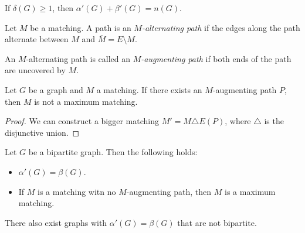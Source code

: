 
\begin{theorem}[Gallai]
    If $\delta(G) \ge 1$, then $\alpha'(G) + \beta'(G) = n(G)$.
\end{theorem}


\begin{definition}
    Let $M$ be a matching. A path is an \emph{$M$-alternating path}
    if the edges along the path alternate between $M$ and $\overline{M} = E \setminus M$.
\end{definition}

\begin{definition}
    An $M$-alternating path is called an \emph{$M$-augmenting path}
    if both ends of the path are uncovered by $M$.
\end{definition}


\begin{proposition}
    Let $G$ be a graph and $M$ a matching. If there exists an $M$-augmenting path 
    $P$, then $M$ is not a maximum matching.
\end{proposition}

\begin{proof}
    We can construct a bigger matching $M' = M \triangle E(P)$, where 
    $\triangle$ is the disjunctive union.
\end{proof}

\begin{theorem}[König]
    Let $G$ be a bipartite graph. Then the following holds:
    \begin{itemize}[(a)]
        \item $\alpha'(G) = \beta(G)$.
        \item If $M$ is a matching witn no $M$-augmenting path, then $M$ is a 
        maximum matching.
    \end{itemize}    
\end{theorem}


\begin{remark}
    There also exist graphs with $\alpha'(G) = \beta(G)$ that are not bipartite.
\end{remark}


